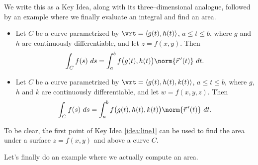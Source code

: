 We write this as a Key Idea, along with its three--dimensional analogue, followed by an example where we finally evaluate an integral and find an area.

{\begin{itemize}
	\item Let $C$ be a curve parametrized by $\vrt =\langle g(t), h(t)\rangle$, $a\leq t\leq b$, where $g$ and $h$ are continuously differentiable, and let $z=f(x,y)$. Then
	$$\int_Cf(s)\ ds = \int_a^bf\big(g(t),h(t)\big)\norm{\vec r\,'(t)}\ dt.$$
	\item Let $C$ be a curve parametrized by $\vrt =\langle g(t), h(t),k(t)\rangle$, $a\leq t\leq b$, where $g$, $h$ and $k$ are continuously differentiable, and let $w=f(x,y,z)$. Then
	$$\int_Cf(s)\ ds = \int_a^bf\big(g(t),h(t),k(t)\big)\norm{\vec r\,'(t)}\ dt.$$
\end{itemize}
}

To be clear, the first point of Key Idea \ref{idea:line1} can be used to find the area under a surface $z=f(x,y)$ and above a curve $C$.

Let's finally do an example where we actually compute an area.\\

